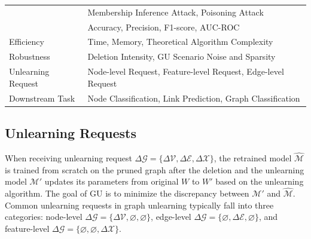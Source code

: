 \begin{table}[t]
{\begin{tabular}{>{\centering\arraybackslash}p{2cm}|
    >{\centering\arraybackslash}p{6cm}}
{Attack}  & {Membership Inference Attack, Poisoning Attack}\\
{Effectiveness}  & {Accuracy, Precision, F1-score, AUC-ROC} \\ 
Efficiency & {Time, Memory, Theoretical Algorithm Complexity} \\ 

Robustness & {Deletion Intensity, GU Scenario Noise and Sparsity} \\
Unlearning Request &  {Node-level Request, Feature-level Request, Edge-level Request} \\
Downstream Task & {Node Classification, Link Prediction, Graph Classification}\\
 \midrule[0.08em] %
\end{tabular}}
\end{table}


\subsection{Unlearning Requests}
\label{unlearning_request}
When receiving unlearning request $\Delta \mathcal{G}=\{\Delta \mathcal{V}, \Delta \mathcal{E}, \Delta \mathcal{X}\}$, the retrained model $\hat{\mathcal{M}}$ is trained from scratch on the pruned graph after the deletion and the unlearning model $\mathcal{M'}$ updates its parameters from original $W$ to $W'$ based on the unlearning algorithm. The goal of GU is to minimize the discrepancy between $\mathcal{M'}$ and $\hat{\mathcal{M}}$. Common unlearning requests in graph unlearning typically fall into three categories: node-level $\Delta \mathcal{G}=\{\Delta \mathcal{V}, \varnothing, \varnothing\}$, edge-level  $\Delta \mathcal{G}=\{\varnothing, \Delta \mathcal{E}, \varnothing\}$, and feature-level $\Delta \mathcal{G}=\{\varnothing, \varnothing, \Delta \mathcal{X}\}$. 

